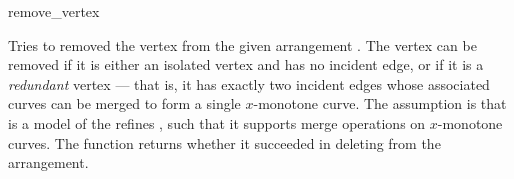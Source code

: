 
\ccRefPageBegin

\begin{ccRefFunction}{remove_vertex}


   {Tries to removed the vertex  from the given arrangement .
    The vertex can be removed if it is either an isolated vertex and has no
    incident edge, or if it is a {\sl redundant} vertex --- that is, it has
    exactly two incident edges whose associated curves can be merged to form
    a single $x$-monotone curve. The assumption is that  is a
    model of the refines , such that it
    supports merge operations on $x$-monotone curves.
    The function returns whether it succeeded in deleting  from the
    arrangement.}

\end{ccRefFunction}

\ccRefPageEnd
